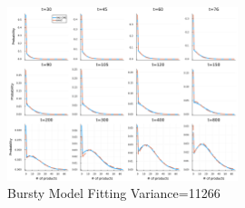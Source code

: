 \documentclass[a4paper,10pt]{article}
\begin{document}
\begin{figure}[h]
	\centering
	\includegraphics[width=0.6\textwidth]{Figs/fit_var=11266.pdf}
	\caption{Bursty Model Fitting Variance=11266}\label{Bursty_fitting_var=11266}  
\end{figure}
\end{document}

